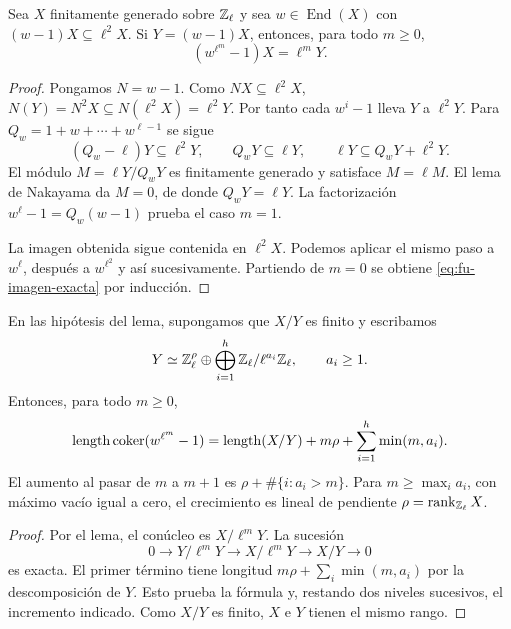 \begin{lema}
\label{lem:fu-imagen}
Sea $X$ finitamente generado sobre $\mathbb{Z}_\ell$ y sea
$w\in\operatorname{End}(X)$ con $(w-1)X\subseteq\ell^2X$.
Si $Y=(w-1)X$, entonces, para todo $m\ge0$,
\begin{equation}
 (w^{\ell^m}-1)X=\ell^mY.
 \label{eq:fu-imagen-exacta}
\end{equation}
\end{lema}

\begin{proof}
Pongamos $N=w-1$. Como $NX\subseteq\ell^2X$,
$N(Y)=N^2X\subseteq N(\ell^2X)=\ell^2Y$.
Por tanto cada $w^i-1$ lleva $Y$ a $\ell^2Y$.
Para $Q_w=1+w+\cdots+w^{\ell-1}$ se sigue
\[
 (Q_w-\ell)Y\subseteq\ell^2Y,\qquad
 Q_wY\subseteq\ell Y,\qquad
 \ell Y\subseteq Q_wY+\ell^2Y.
\]
El módulo $M=\ell Y/Q_wY$ es finitamente generado y satisface
$M=\ell M$. El lema de Nakayama da $M=0$, de donde
$Q_wY=\ell Y$. La factorización
$w^\ell-1=Q_w(w-1)$ prueba el caso $m=1$.

La imagen obtenida sigue contenida en $\ell^2X$.
Podemos aplicar el mismo paso a $w^\ell$, después a
$w^{\ell^2}$ y así sucesivamente. Partiendo de $m=0$
se obtiene \eqref{eq:fu-imagen-exacta} por inducción.
\end{proof}

\begin{proposicion}
\label{prop:fu-crecimiento}
En las hipótesis del lema, supongamos que $X/Y$ es finito y
escribamos
\[
 Y\simeq\mathbb{Z}_\ell^\rho\oplus
       \bigoplus_{i=1}^{h}\mathbb{Z}_\ell/\ell^{a_i}\mathbb{Z}_\ell,
 \qquad a_i\ge1.
\]
Entonces, para todo $m\ge0$,
\begin{equation}
 \operatorname{length}\operatorname{coker}(w^{\ell^m}-1)
 =\operatorname{length}(X/Y)+m\rho+\sum_{i=1}^{h}\min(m,a_i).
 \label{eq:fu-crecimiento-exacto}
\end{equation}
El aumento al pasar de $m$ a $m+1$ es
$\rho+\#\{i:a_i>m\}$. Para $m\ge\max_i a_i$, con máximo
vacío igual a cero, el crecimiento es lineal de pendiente
$\rho=\operatorname{rank}_{\mathbb{Z}_\ell}X$.
\end{proposicion}

\begin{proof}
Por el lema, el conúcleo es $X/\ell^mY$. La sucesión
\[
 0\longrightarrow Y/\ell^mY\longrightarrow X/\ell^mY
 \longrightarrow X/Y\longrightarrow0
\]
es exacta. El primer término tiene longitud
$m\rho+\sum_i\min(m,a_i)$ por la descomposición de $Y$.
Esto prueba la fórmula y, restando dos niveles sucesivos,
el incremento indicado. Como $X/Y$ es finito, $X$ e $Y$
tienen el mismo rango.
\end{proof}

